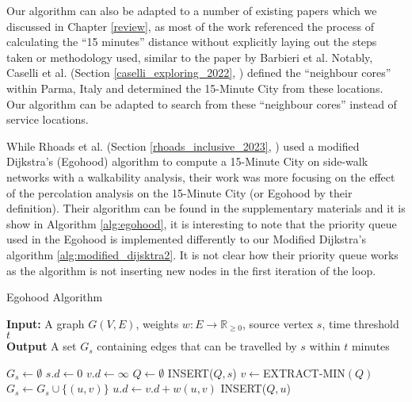 Our algorithm can also be adapted to a number of existing papers which we discussed in Chapter \ref{review}, as most of the work referenced the process of calculating the ``15 minutes'' distance without explicitly laying out the steps taken or methodology used, similar to the paper by Barbieri et al. Notably, Caselli et al. (Section \ref{caselli_exploring_2022}, \cite{caselli_exploring_2022}) defined the ``neighbour cores'' within Parma, Italy and determined the 15-Minute City from these locations. Our algorithm can be adapted to search from these ``neighbour cores'' instead of service locations. 

While Rhoads et al. (Section \ref{rhoads_inclusive_2023}, \cite{rhoads_inclusive_2023}) used a modified Dijkstra's (Egohood) algorithm to compute a 15-Minute City on side-walk networks with a walkability analysis, their work was more focusing on the effect of the percolation analysis on the 15-Minute City (or Egohood by their definition). Their algorithm can be found in the supplementary materials and it is show in Algorithm \ref{alg:egohood}, it is interesting to note that the priority queue used in the Egohood is implemented differently to our Modified Dijkstra's algorithm \ref{alg:modified_dijsktra2}. It is not clear how their priority queue works as the algorithm is not inserting new nodes in the first iteration of the loop.

\begin{algorithm}[H]
    \caption{Egohood Algorithm} \label{alg:egohood}
    \textbf{Input:} A graph $G(V,E)$, weights $w:E\rightarrow\mathbb{R}_{\geq 0}$, source vertex $s$, time threshold $t$ \\
    \textbf{Output} A set $G_s$ containing edges that can be travelled by $s$ within $t$ minutes
    \begin{algorithmic}
        \State $G_s \gets \emptyset$
        \State $s.d\gets 0$
            \State $v.d\gets\infty$
        \EndFor
        \State $Q\gets\emptyset$
        \State INSERT($Q,s$)
            \State $v\gets$EXTRACT-MIN$(Q)$
                    \State $G_s\gets G_s\cup\{(u,v)\}$
                     
                        \State $u.d\gets v.d+w(u,v)$
                        \State INSERT($Q,u$)
                    \EndIf
                \EndIf
            \EndFor
        \EndWhile
    \end{algorithmic}
\end{algorithm}

